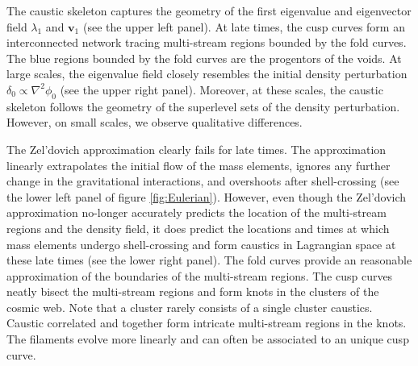 \documentclass[a4paper, 11pt]{article}
\begin{document}
The caustic skeleton captures the geometry of the first eigenvalue and eigenvector field $\lambda_1$ and $\bm{v}_1$ (see the upper left panel). At late times, the cusp curves form an interconnected network tracing multi-stream regions bounded by the fold curves. The blue regions bounded by the fold curves are the progentors of the voids. At large scales, the eigenvalue field closely resembles the initial density perturbation $\delta_0 \propto \nabla^2\phi_0$ (see the upper right panel). Moreover, at these scales, the caustic skeleton follows the geometry of the superlevel sets of the density perturbation. However, on small scales, we observe qualitative differences. 

The Zel'dovich approximation clearly fails for late times. The approximation linearly extrapolates the initial flow of the mass elements, ignores any further change in the gravitational interactions, and overshoots after shell-crossing (see the lower left panel of figure \ref{fig:Eulerian}). However, even though the Zel'dovich approximation no-longer accurately predicts the location of the multi-stream regions and the density field, it does predict the locations and times at which mass elements undergo shell-crossing and form caustics in Lagrangian space at these late times (see the lower right panel). The fold curves provide an reasonable approximation of the boundaries of the multi-stream regions. The cusp curves neatly bisect the multi-stream regions and form knots in the clusters of the cosmic web. Note that a cluster rarely consists of a single cluster caustics. Caustic correlated and together form intricate multi-stream regions in the knots. The filaments evolve more linearly and can often be associated to an unique cusp curve.
\end{document}
